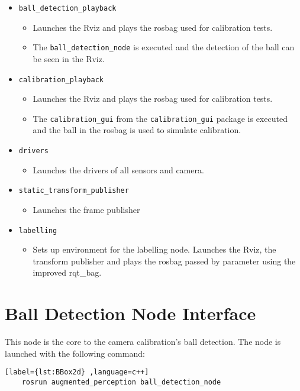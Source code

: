\begin{itemize}
	\item \texttt{ball\_detection\_playback}
	\begin{itemize}
		\item Launches the Rviz and plays the rosbag used for calibration tests. 
		\item The \texttt{ball\_detection\_node} is executed and the detection of the ball can be seen in the Rviz.
	\end{itemize}
	\item \texttt{calibration\_playback}
	\begin{itemize}
		\item Launches the Rviz and plays the rosbag used for calibration tests. 
		\item The \texttt{calibration\_gui} from the \texttt{calibration\_gui} package is executed and the ball in the rosbag is used to simulate calibration.
	\end{itemize}
	\item \texttt{drivers}
	\begin{itemize}
		\item Launches the drivers of all sensors and camera.
	\end{itemize}
	\item \texttt{static\_transform\_publisher}
	\begin{itemize}
		\item Launches the frame publisher
	\end{itemize}
	\item \texttt{labelling}
	\begin{itemize}
		\item Sets up environment for the labelling node. Launches the Rviz, the transform publisher and plays the rosbag passed by parameter using the improved rqt\_bag.
	\end{itemize}	
\end{itemize}

\section{Ball Detection Node Interface}

This node is the core to the camera calibration's ball detection. The node is launched with the following command:

\begin{center}
	\begin{lstlisting}[label={lst:BBox2d} ,language=c++]
	rosrun augmented_perception ball_detection_node\end{lstlisting}
\end{center}

